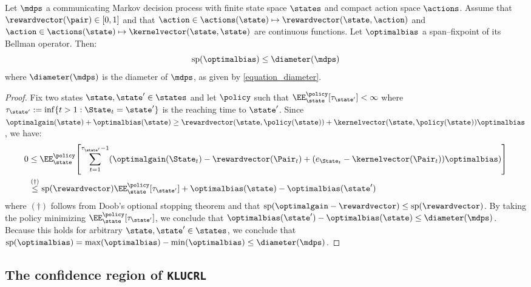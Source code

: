 \documentclass[preprint,cleveref,12pt]{colt2025}
\DeclarePairedDelimiter{\braces}{\{}{\}}	%
\DeclarePairedDelimiter{\brackets}{[}{]}	%
\DeclarePairedDelimiter{\parens}{(}{)}	%
\newcommand{\vecspan}[1]{\mathrm{sp}\parens{#1}}
\def\models{\mdps}
\def\kernel{\kernelvector}
\def\reward{\rewardvector}
\def\optgain{\optimalgain} %
\def\optbias{\optimalbias} %
\begin{document}
    \begin{lemma}
    \label{lemma_bias_bounded_diameter}
        Let $\models$ a communicating Markov decision process with finite state space $\states$ and compact action space $\actions$. 
        Assume that $\reward(\pair) \in [0, 1]$ and that $\action \in \actions(\state) \mapsto \reward(\state, \action)$ and $\action \in \actions(\state) \mapsto \kernel(\state, \state)$ are continuous functions. 
        Let $\optbias$ a span--fixpoint of its Bellman operator. 
        Then:
        \begin{equation*}
            \vecspan{\optbias} \le \diameter(\models)
        \end{equation*}
        where $\diameter(\models)$ is the diameter of $\models$, as given by \eqref{equation_diameter}.
    \end{lemma}
    \begin{proof}
        Fix two states $\state, \state' \in \states$ and let $\policy$ such that $\EE_{\state}^{\policy}[\tau_{\state'}] < \infty$ where $\tau_{\state'} := \inf\braces{t > 1: \State_t = \state'}$ is the reaching time to $\state'$. 
        Since $\optgain(\state) + \optbias(\state) \ge \reward(\state, \policy(\state)) + \kernel(\state, \policy(\state)) \optbias$, we have:
        \begin{align*}
            0 
            & \le
            \EE_{\state}^{\policy} \brackets*{
                \sum_{t=1}^{\tau_{\state'} - 1}
                \parens*{
                    \optgain(\State_t) - \reward(\Pair_t)
                    + 
                    \parens*{e_{\State_t} - \kernel(\Pair_t)} \optbias
                }
            }
            \\
            & \overset{(\dagger)}\le
            \vecspan{\reward}
            \EE_{\state}^\policy [\tau_{\state'}]
            + \optbias(\state) - \optbias(\state')
        \end{align*}
        where $(\dagger)$ follows from Doob's optional stopping theorem and that $\vecspan{\optgain - \reward} \le \vecspan{\reward}$. 
        By taking the policy minimizing $\EE_{\state}^\policy[\tau_{\state'}]$, we conclude that $\optbias(\state') - \optbias(\state) \le \diameter(\models)$.
        Because this holds for arbitrary $\state, \state' \in \states$, we conclude that $\vecspan{\optbias} = \max(\optbias) - \min(\optbias) \le \diameter(\models)$. 
    \end{proof}

    \subsection{The confidence region of \texttt{KLUCRL}}
    \label{appendix_confidence_region}
\end{document}
